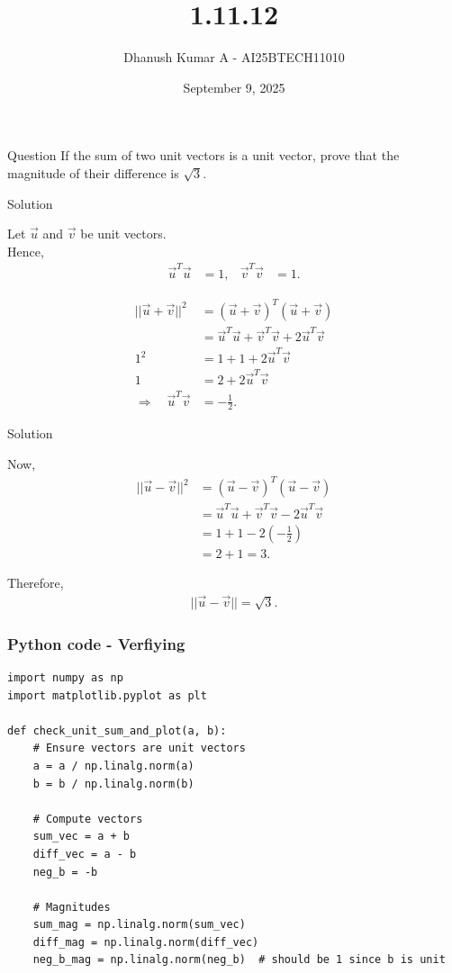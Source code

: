 \documentclass{beamer}
\title 
{1.11.12}
\date{September 9, 2025}
\author 
{Dhanush Kumar A - AI25BTECH11010}
\begin{document}
\frame{\titlepage}
\begin{frame}{Question}
If the sum of two unit vectors is a unit vector, prove that the magnitude of their difference is \(\sqrt{3}\).
\end{frame}
\begin{frame}{Solution}

Let 
	$\vec{u}$ and $\vec{v}$ be unit vectors.\\
	Hence,
\begin{align}
	\vec{u}^T \vec{u} &= 1, & \vec{v}^T \vec{v} &= 1.
\end{align}

\medskip

\begin{align}
||\vec{u}+\vec{v}||^2 &= (\vec{u}+\vec{v})^T(\vec{u}+\vec{v}) \\
&= \vec{u}^T\vec{u} + \vec{v}^T\vec{v} + 2\vec{u}^T\vec{v} \\
1^2 &= 1 + 1 + 2\vec{u}^T\vec{v} \\
1 &= 2 + 2\vec{u}^T\vec{v} \\
\Rightarrow \quad \vec{u}^T\vec{v} &= -\tfrac{1}{2}.
\end{align}

\medskip
\end{frame}
\begin{frame}{Solution}


Now,  
\begin{align}
||\vec{u}-\vec{v}||^2 &= (\vec{u}-\vec{v})^T(\vec{u}-\vec{v}) \\
&= \vec{u}^T\vec{u} + \vec{v}^T\vec{v} - 2\vec{u}^T\vec{v} \\
&= 1 + 1 - 2\left(-\tfrac{1}{2}\right) \\
&= 2 + 1 = 3.
\end{align}

Therefore,  
\begin{align}
||\vec{u}-\vec{v}|| = \sqrt{3}.
\end{align}
\end{frame}
\begin{frame}[fragile]                            
\frametitle{Python code - Verfiying }                
\begin{lstlisting}
import numpy as np
import matplotlib.pyplot as plt

def check_unit_sum_and_plot(a, b):
    # Ensure vectors are unit vectors
    a = a / np.linalg.norm(a)
    b = b / np.linalg.norm(b)
    
    # Compute vectors
    sum_vec = a + b
    diff_vec = a - b
    neg_b = -b
    
    # Magnitudes
    sum_mag = np.linalg.norm(sum_vec)
    diff_mag = np.linalg.norm(diff_vec)
    neg_b_mag = np.linalg.norm(neg_b)  # should be 1 since b is unit
\end{lstlisting}

    \end{frame}
\end{document}
